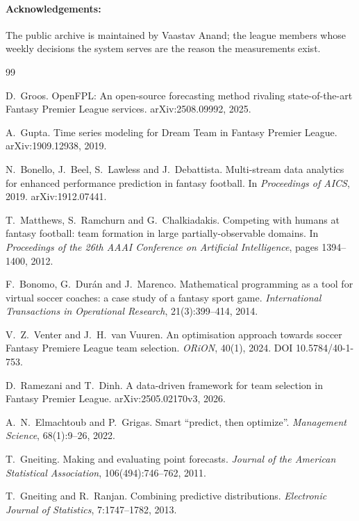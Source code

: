 \documentclass[11pt,a4paper]{article}
\begin{document}
\paragraph{Acknowledgements:} The public archive is maintained by Vaastav Anand; the league members whose weekly decisions the system serves are the reason the measurements exist.

\begin{thebibliography}{99}\small

 D.\ Groos. OpenFPL: An open-source forecasting method rivaling state-of-the-art Fantasy Premier League services. arXiv:2508.09992, 2025.

 A.\ Gupta. Time series modeling for Dream Team in Fantasy Premier League. arXiv:1909.12938, 2019.

 N.\ Bonello, J.\ Beel, S.\ Lawless and J.\ Debattista. Multi-stream data analytics for enhanced performance prediction in fantasy football. In \emph{Proceedings of AICS}, 2019. arXiv:1912.07441.

 T.\ Matthews, S.\ Ramchurn and G.\ Chalkiadakis. Competing with humans at fantasy football: team formation in large partially-observable domains. In \emph{Proceedings of the 26th AAAI Conference on Artificial Intelligence}, pages 1394--1400, 2012.

 F.\ Bonomo, G.\ Dur\'an and J.\ Marenco. Mathematical programming as a tool for virtual soccer coaches: a case study of a fantasy sport game. \emph{International Transactions in Operational Research}, 21(3):399--414, 2014.

 V.\ Z.\ Venter and J.\ H.\ van Vuuren. An optimisation approach towards soccer Fantasy Premiere League team selection. \emph{ORiON}, 40(1), 2024. DOI 10.5784/40-1-753.

 D.\ Ramezani and T.\ Dinh. A data-driven framework for team selection in Fantasy Premier League. arXiv:2505.02170v3, 2026.

 A.\ N.\ Elmachtoub and P.\ Grigas. Smart ``predict, then optimize''. \emph{Management Science}, 68(1):9--26, 2022.

 T.\ Gneiting. Making and evaluating point forecasts. \emph{Journal of the American Statistical Association}, 106(494):746--762, 2011.

 T.\ Gneiting and R.\ Ranjan. Combining predictive distributions. \emph{Electronic Journal of Statistics}, 7:1747--1782, 2013.


\end{thebibliography}
\end{document}
